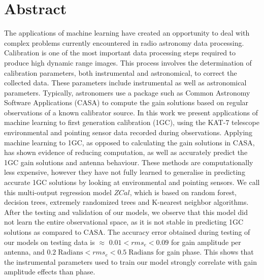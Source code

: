\chapter*{Abstract} 


The applications of machine learning have created an opportunity to deal with complex problems currently encountered in radio astronomy data processing. Calibration is one of the most important data processing steps required to produce high dynamic range images. This process involves the determination of calibration parameters, both instrumental and astronomical, to correct the
collected data. These parameters include instrumental as well as astronomical parameters. Typically, astronomers use a package such as Common Astronomy Software Applications (CASA) to compute the gain solutions based on regular observations of a known calibrator source. In this work we present applications of machine learning to first generation calibration (1GC), using the KAT-7 telescope environmental and pointing sensor data recorded during observations. Applying machine learning to 1GC, as opposed to calculating the gain solutions in CASA, has shown evidence of reducing computation, as well as accurately predict the 1GC gain solutions and antenna behaviour. These methods are computationally less expensive, however they have not fully learned to generalise  in predicting  accurate 1GC solutions by looking at environmental and pointing sensors. We call this multi-output regression model $\textit{ZCal}$, which is based on random forest, decision trees, extremely randomized trees and K-nearest neighbor algorithms. After the testing and validation of our models, we observe that this model did not learn the entire observational space, as it is not stable in predicting 1GC solutions as compared to CASA. The accuracy error obtained during testing of our models on testing data is $\approx$ $0.01< rms_{e} <0.09$ for gain amplitude per antenna, and $0.2 \; \mathrm{Radians}< rms_{e}<0.5\; \mathrm{Radians}$ for gain phase. This shows that the instrumental parameters used to train our model strongly correlate with gain amplitude effects than phase.  


